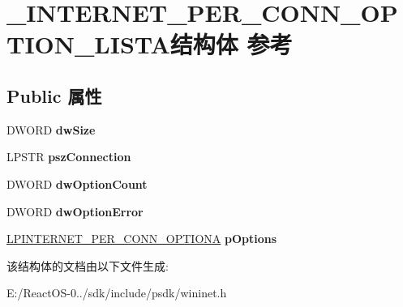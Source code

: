 \hypertarget{struct___i_n_t_e_r_n_e_t___p_e_r___c_o_n_n___o_p_t_i_o_n___l_i_s_t_a}{}\section{\+\_\+\+I\+N\+T\+E\+R\+N\+E\+T\+\_\+\+P\+E\+R\+\_\+\+C\+O\+N\+N\+\_\+\+O\+P\+T\+I\+O\+N\+\_\+\+L\+I\+S\+T\+A结构体 参考}
\label{struct___i_n_t_e_r_n_e_t___p_e_r___c_o_n_n___o_p_t_i_o_n___l_i_s_t_a}
\subsection*{Public 属性}
\begin{DoxyCompactItemize}
\item 
\mbox{\label{struct___i_n_t_e_r_n_e_t___p_e_r___c_o_n_n___o_p_t_i_o_n___l_i_s_t_a_a11cefb8b28bdfb8d8e3b1325ef262d15}} 
D\+W\+O\+RD {\bfseries dw\+Size}
\item 
\mbox{\label{struct___i_n_t_e_r_n_e_t___p_e_r___c_o_n_n___o_p_t_i_o_n___l_i_s_t_a_a99a20549dacf357d8a51e23154143d35}} 
L\+P\+S\+TR {\bfseries psz\+Connection}
\item 
\mbox{\label{struct___i_n_t_e_r_n_e_t___p_e_r___c_o_n_n___o_p_t_i_o_n___l_i_s_t_a_a7e943246116eedc8edb4642c905fbcf8}} 
D\+W\+O\+RD {\bfseries dw\+Option\+Count}
\item 
\mbox{\label{struct___i_n_t_e_r_n_e_t___p_e_r___c_o_n_n___o_p_t_i_o_n___l_i_s_t_a_ab9eb0dffdd41d639e08c79ff37725c6e}} 
D\+W\+O\+RD {\bfseries dw\+Option\+Error}
\item 
\mbox{\label{struct___i_n_t_e_r_n_e_t___p_e_r___c_o_n_n___o_p_t_i_o_n___l_i_s_t_a_ab032216a1ea02641882f98c111a10bbd}} 
\hyperlink{struct___i_n_t_e_r_n_e_t___p_e_r___c_o_n_n___o_p_t_i_o_n_a}{L\+P\+I\+N\+T\+E\+R\+N\+E\+T\+\_\+\+P\+E\+R\+\_\+\+C\+O\+N\+N\+\_\+\+O\+P\+T\+I\+O\+NA} {\bfseries p\+Options}
\end{DoxyCompactItemize}


该结构体的文档由以下文件生成\+:\begin{DoxyCompactItemize}
\item 
E\+:/\+React\+O\+S-\/0../sdk/include/psdk/wininet.\+h\end{DoxyCompactItemize}
